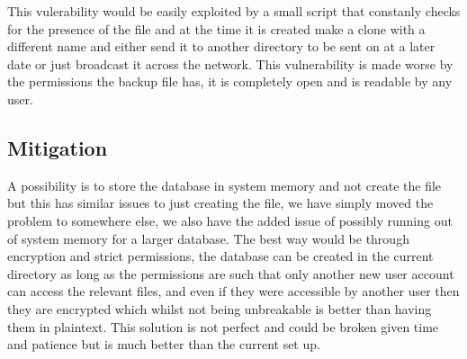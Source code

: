 \documentclass[paper=a4, fontsize=11pt]{scrartcl}
\numberwithin{equation}{section}		%
\numberwithin{figure}{section}			%
\numberwithin{table}{section}				%
\begin{document}

This vulerability would be easily exploited by a small script that constanly checks for the presence of the file and at the time it is created make a clone with a different name and either send it to another directory to be sent on at a later date or just broadcast it across the network. This vulnerability is made worse by the permissions the backup file has, it is completely open and is readable by any user.

\subsection*{Mitigation}


A possibility is to store the database in system memory and not create the file but this has similar issues to just creating the file, we have simply moved the problem to somewhere else, we also have the added issue of possibly running out of system memory for a larger database. The best way would be through encryption and strict permissions, the database can be created in the current directory as long as the permissions are such that only another new user account can access the relevant files, and even if they were accessible by another user then they are encrypted which whilst not being unbreakable is better than having them in plaintext. This solution is not perfect and could be broken given time and patience but is much better than the current set up.

\end{document}
